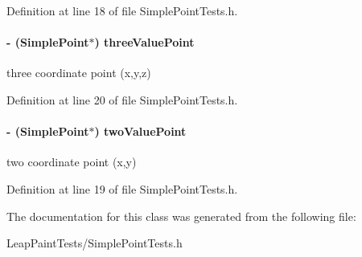 Definition at line 18 of file Simple\-Point\-Tests.\-h.

\hypertarget{interface_simple_point_tests_a3eaccf68ce0b22a31daba1edb2e70762}{
\paragraph[{three\-Value\-Point}]{\setlength{\rightskip}{0pt plus 5cm}-\/ ({\bf Simple\-Point}$\ast$) three\-Value\-Point\hspace{0.3cm}{\ttfamily [protected]}}}\label{df/dbc/interface_simple_point_tests_a3eaccf68ce0b22a31daba1edb2e70762}
three coordinate point (x,y,z) 

Definition at line 20 of file Simple\-Point\-Tests.\-h.

\hypertarget{interface_simple_point_tests_a7de54d867fc86e46d98627fd689508f6}{
\paragraph[{two\-Value\-Point}]{\setlength{\rightskip}{0pt plus 5cm}-\/ ({\bf Simple\-Point}$\ast$) two\-Value\-Point\hspace{0.3cm}{\ttfamily [protected]}}}\label{df/dbc/interface_simple_point_tests_a7de54d867fc86e46d98627fd689508f6}
two coordinate point (x,y) 

Definition at line 19 of file Simple\-Point\-Tests.\-h.



The documentation for this class was generated from the following file\-:\begin{DoxyCompactItemize}
\item 
Leap\-Paint\-Tests/Simple\-Point\-Tests.\-h\end{DoxyCompactItemize}
